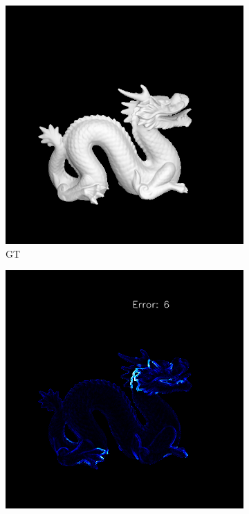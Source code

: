 \documentclass[border=15pt, multi, tikz]{article}
\begin{document}
\begin{figure}[H]
	
	\begin{subfigure}[b]{0.24\linewidth}
		\includegraphics[width=\linewidth]{./Figures/comparison/fancy_eval_22_img.png}
		\caption{GT}
	\end{subfigure}
	\begin{subfigure}[b]{0.24\linewidth}
		\includegraphics[width=\linewidth]{./Figures/comparison/fancy_eval_22_error_SVD.png}

\end{subfigure}
\end{figure}
\end{document}
